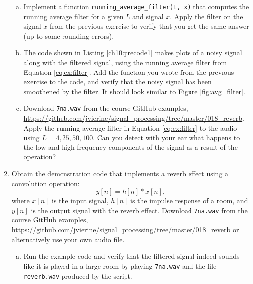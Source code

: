\begin{enumerate}
\begin{enumerate}[a)]
          \item Implement a function \verb|running_average_filter(L, x)| that computes the running average filter
                for a given $L$ and signal $x$. Apply the filter on the signal $x$ from the previous exercise
                to verify that you get the same answer (up to some rounding errors).
          \item The code shown in Listing \ref{ch10:precode1} makes plots of a noisy signal
                along with the filtered signal, using the running average filter from Equation \ref{eq:ex:filter}.
                Add the function you wrote from the previous exercise to the code, and verify that the noisy
                signal has been smoothened by the filter. It should look similar to Figure \ref{fig:avg_filter}.
                
          \item Download \verb|7na.wav| from the course GitHub examples, 
                \url{https://github.com/jvierine/signal_processing/tree/master/018_reverb}. 
                Apply the running average filter in Equation \ref{eq:ex:filter} to the audio using 
                $L = 4, 25, 50, 100$. Can you detect with your ear what happens to the
                low and high frequency components of the signal as a result of
                the operation?
        \end{enumerate}

  \item Obtain the demonstration code that implements a reverb effect
        using a convolution operation:
        \begin{equation}
          y[n] = h[n]*x[n],
        \end{equation}
        where $x[n]$ is the input signal, $h[n]$ is the impulse response
        of a room, and $y[n]$ is the output signal with the reverb
        effect. Download \verb|7na.wav| from the course GitHub examples,
        \url{https://github.com/jvierine/signal_processing/tree/master/018_reverb}
        or alternatively use your own audio file.

        \begin{enumerate}[a)]

          \item Run the example code and verify that the filtered signal indeed sounds like it
                is played in a large room by playing \verb|7na.wav| and the file \verb|reverb.wav|
                produced by the script.


\end{enumerate}
\end{enumerate}
